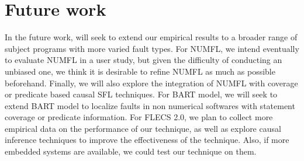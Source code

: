 \section{Future work}
In the future work, will seek to extend our empirical results to a broader range of subject programs with more varied fault types.  For NUMFL, we intend eventually to evaluate NUMFL in a user study, but given the difficulty of conducting an unbiased one, we think it is desirable to refine NUMFL as much as possible beforehand.  Finally, we will also explore the integration of NUMFL with coverage or predicate based causal SFL techniques. For BART model, we will seek to extend BART model to localize faults in non numerical softwares with statement coverage or predicate information. For FLECS 2.0, we plan to collect more empirical data on the performance of our technique, as well as explore causal inference techniques to improve the effectiveness of the technique. Also, if more embedded systems are available, we could test our technique on them. 










